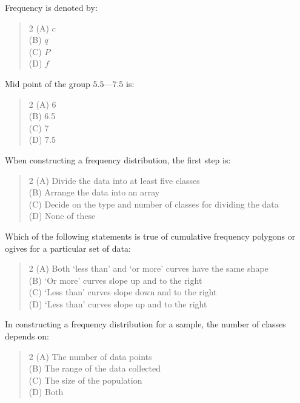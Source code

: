 \documentclass[11pt,a4paper]{article}
\begin{document}
\begin{mcqlist}
\item Frequency is denoted by:
\begin{quote}\begin{multicols}{2}
\noindent (A) $c$ \\
(B) $q$ \\
(C) $P$ \\
(D) $f$
\end{multicols}\end{quote}

\item Mid point of the group $5.5$---$7.5$ is:
\begin{quote}\begin{multicols}{2}
\noindent (A) 6 \\
(B) 6.5 \\
(C) 7 \\
(D) 7.5
\end{multicols}\end{quote}

\item When constructing a frequency distribution, the first step is:
\begin{quote}\begin{multicols}{2}
\noindent (A) Divide the data into at least five classes \\
(B) Arrange the data into an array \\
(C) Decide on the type and number of classes for dividing the data \\
(D) None of these
\end{multicols}\end{quote}

\item Which of the following statements is true of cumulative frequency polygons or ogives for a particular set of data:
\begin{quote}\begin{multicols}{2}
\noindent (A) Both `less than' and `or more' curves have the same shape \\
(B) `Or more' curves slope up and to the right \\
(C) `Less than' curves slope down and to the right \\
(D) `Less than' curves slope up and to the right
\end{multicols}\end{quote}

\item In constructing a frequency distribution for a sample, the number of classes depends on:
\begin{quote}\begin{multicols}{2}
\noindent (A) The number of data points \\
(B) The range of the data collected \\
(C) The size of the population \\
(D) Both
\end{multicols}\end{quote}


\end{mcqlist}
\end{document}
